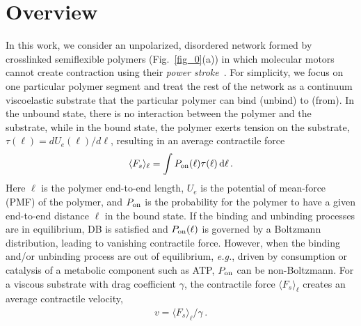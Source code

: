 \documentclass[twocolumn,prl,english]{revtex4-1}
\newcommand*\diff{\mathop{}\!\mathrm{d}}
\begin{document}
\section{Overview}
In this work, we consider an unpolarized, disordered network formed by crosslinked semiflexible polymers (Fig.~\ref{fig_0}(a)) in which molecular motors cannot create contraction using their {\it power stroke}~\cite{Julicher1997}.  For simplicity, we focus on one particular polymer segment and treat the rest of the network as a continuum viscoelastic substrate that the particular polymer can bind (unbind) to (from). In the unbound state, there is no interaction between the polymer and the substrate, while in the bound state, the polymer exerts tension on the substrate, $\tau(\ell)= dU_e(\ell)/d\ell$, resulting in an average contractile force
\begin{equation}
\begin{aligned}
\langle F_s \rangle_\ell=\int P_{\rm on}(\ell)\tau(\ell)\diff\ell \, .
\end{aligned}
\label{e26}
\end{equation}
Here $\ell$ is the polymer end-to-end length, $U_e$ is the potential of mean-force (PMF) of the polymer, 
and $P_{\rm on}$ is the probability  for the polymer to have a given end-to-end distance $\ell$ in the bound state. If the binding and unbinding processes are in equilibrium, DB is satisfied and $P_{\rm on}(\ell)$ is governed by a Boltzmann distribution,  leading to vanishing contractile force. 
However, when the binding and/or unbinding process are out of equilibrium, {\it e.g.}, driven by consumption or catalysis of a metabolic component such as ATP,   
$P_{\rm on}$ can be non-Boltzmann. For a viscous substrate with drag coefficient $\gamma$,  the contractile force $\langle F_s\rangle_\ell$ creates an average contractile velocity, 
\begin{equation}
\begin{aligned}
v=\langle F_s \rangle_\ell/\gamma \, .
\end{aligned}
\label{e40}
\end{equation}
\end{document}
